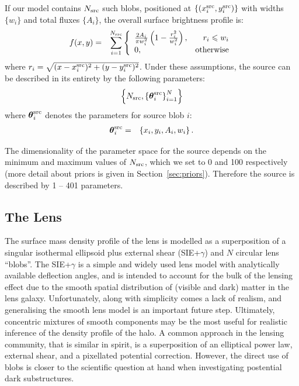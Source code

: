 \documentclass[useAMS,usenatbib]{mn2e}
\begin{document}
If our model contains $N_{\rm src}$ such blobs, positioned at
$\left\{(x_i^{\rm src}, y_i^{\rm src})\right\}$ with widths $\{w_i\}$ and total fluxes
$\{A_i\}$, the overall surface brightness profile is:
\begin{eqnarray}
f(x, y) &=& \sum_{i=1}^{N_{\rm src}}\left\{
\begin{array}{lr}
\frac{2A_i}{\pi w_i^2}\left(1 - \frac{r_i^2}{w_i^2}\right), & r_i \leq w_i\\
0, & \textnormal{otherwise}
\end{array}
\right.
\end{eqnarray}
where $r_i = \sqrt{(x - x_i^{\rm src})^2 + (y - y_i^{\rm src})^2}$.
Under these assumptions, the source can be described in its entirety
by the following parameters:
\begin{eqnarray}
\left\{
N_{\rm src}, \left\{\boldsymbol{\theta}^{\rm src}_i\right\}_{i=1}^N
\right\}
\end{eqnarray}
where $\boldsymbol{\theta}^{\rm src}_i$ denotes the parameters for source blob $i$:
\begin{eqnarray}
\boldsymbol{\theta}^{\rm src}_i &=& \left\{x_i, y_i, A_i, w_i
\right\}.
\end{eqnarray}

The dimensionality of the parameter space for the source depends on the
minimum and maximum values of $N_{\rm src}$, which we set to 0 and 100
respectively (more detail about priors is given in Section~\ref{sec:priors}).
Therefore the source is described by 1 -- 401 parameters.

\subsection{The Lens}
The surface mass density profile of the lens is modelled as a superposition
of a singular isothermal ellipsoid plus external shear (SIE+$\gamma$) and
$N$ circular lens ``blobs''. The SIE+$\gamma$ is a simple and widely used lens
model with analytically available deflection angles, and is intended to account
for the bulk of the lensing effect due to the smooth spatial distribution
of (visible and dark) matter in the lens galaxy. Unfortunately, along with
simplicity comes a lack of realism, and generalising the smooth lens model
is an important future step. Ultimately, concentric
mixtures of smooth components may be the most useful for realistic inference
of the density profile of the halo. A common approach in the lensing
community, that is similar in spirit, is a superposition of an elliptical
power law, external shear, and a pixellated potential correction. However, the
direct use of blobs is closer to the scientific question at hand
when investigating postential dark substructures.
\end{document}
